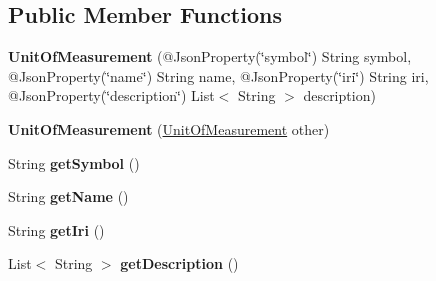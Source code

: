 \subsection*{Public Member Functions}
\begin{DoxyCompactItemize}
\item 
\mbox{\label{classeu_1_1h2020_1_1symbiote_1_1model_1_1cim_1_1UnitOfMeasurement_a54f028d7ce12b85579cb7ffecf269402}} 
{\bfseries Unit\+Of\+Measurement} (@Json\+Property(\char`\"{}symbol\char`\"{}) String symbol, @Json\+Property(\char`\"{}name\char`\"{}) String name, @Json\+Property(\char`\"{}iri\char`\"{}) String iri, @Json\+Property(\char`\"{}description\char`\"{}) List$<$ String $>$ description)
\item 
\mbox{\label{classeu_1_1h2020_1_1symbiote_1_1model_1_1cim_1_1UnitOfMeasurement_a5a9f6e1bad76e2be896a05246ce9c706}} 
{\bfseries Unit\+Of\+Measurement} (\hyperlink{classeu_1_1h2020_1_1symbiote_1_1model_1_1cim_1_1UnitOfMeasurement}{Unit\+Of\+Measurement} other)
\item 
\mbox{\label{classeu_1_1h2020_1_1symbiote_1_1model_1_1cim_1_1UnitOfMeasurement_aebd262076e919691505934164ab68a23}} 
String {\bfseries get\+Symbol} ()
\item 
\mbox{\label{classeu_1_1h2020_1_1symbiote_1_1model_1_1cim_1_1UnitOfMeasurement_abe16a657afb87fde66ba403df3dffe42}} 
String {\bfseries get\+Name} ()
\item 
\mbox{\label{classeu_1_1h2020_1_1symbiote_1_1model_1_1cim_1_1UnitOfMeasurement_a0389946d4ade41b25c3dae72b8cd0260}} 
String {\bfseries get\+Iri} ()
\item 
\mbox{\label{classeu_1_1h2020_1_1symbiote_1_1model_1_1cim_1_1UnitOfMeasurement_a682022835cc6c2b11a8c626ea351720f}} 
List$<$ String $>$ {\bfseries get\+Description} ()
\item 
\mbox{\label{classeu_1_1h2020_1_1symbiote_1_1model_1_1cim_1_1UnitOfMeasurement_af82f2452a612131f787265e0c8536944}} 

\end{DoxyCompactItemize}
